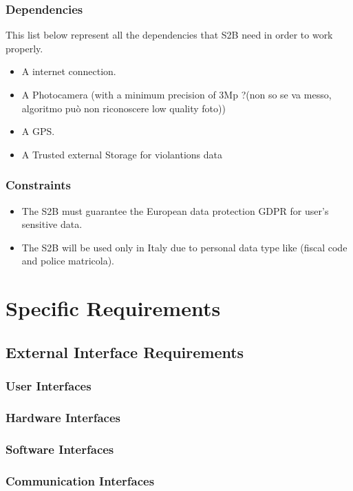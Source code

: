 \documentclass{article}
\begin{document}
\subsubsection{Dependencies}
This list below represent all the dependencies that S2B need in order to work properly.
\begin{itemize}
    \item A internet connection.
    \item A Photocamera (with a minimum precision of 3Mp ?(non so se va messo, algoritmo può non riconoscere low quality foto))
    \item A GPS.
    \item A Trusted external Storage for violantions data   
\end{itemize}

\subsubsection{Constraints}
\begin{itemize}
    \item The S2B must guarantee the European data protection GDPR for user's sensitive data.
    \item The S2B will be used only in Italy due to personal data type like (fiscal code and police matricola).
\end{itemize}

\section{Specific Requirements}

\subsection{External Interface Requirements}
\subsubsection{User Interfaces}
\subsubsection{Hardware Interfaces}
\subsubsection{Software Interfaces}
\subsubsection{Communication Interfaces}
\end{document}
